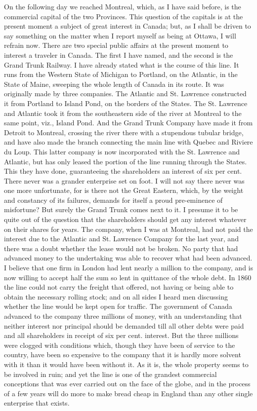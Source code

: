 On the following day we reached Montreal, which, as I have said
before, is the commercial capital of the two Provinces.  This
question of the capitals is at the present moment a subject of
great interest in Canada; but, as I shall be driven to say
something on the matter when I report myself as being at Ottawa, I
will refrain now.  There are two special public affairs at the
present moment to interest a traveler in Canada.  The first I have
named, and the second is the Grand Trunk Railway.  I have already
stated what is the course of this line.  It runs from the Western
State of Michigan to Portland, on the Atlantic, in the State of
Maine, sweeping the whole length of Canada in its route.  It was
originally made by three companies.  The Atlantic and St. Lawrence
constructed it from Portland to Island Pond, on the borders of the
States.  The St. Lawrence and Atlantic took it from the
southeastern side of the river at Montreal to the same point, viz.,
Island Pond.  And the Grand Trunk Company have made it from Detroit
to Montreal, crossing the river there with a stupendous tubular
bridge, and have also made the branch connecting the main line with
Quebec and Riviere du Loup.  This latter company is now
incorporated with the St. Lawrence and Atlantic, but has only
leased the portion of the line running through the States.  This
they have done, guaranteeing the shareholders an interest of six
per cent.  There never was a grander enterprise set on foot.  I
will not say there never was one more unfortunate, for is there not
the Great Eastern, which, by the weight and constancy of its
failures, demands for itself a proud pre-eminence of misfortune?
But surely the Grand Trunk comes next to it.  I presume it to be
quite out of the question that the shareholders should get any
interest whatever on their shares for years.  The company, when I
was at Montreal, had not paid the interest due to the Atlantic and
St. Lawrence Company for the last year, and there was a doubt
whether the lease would not be broken.  No party that had advanced
money to the undertaking was able to recover what had been
advanced.  I believe that one firm in London had lent nearly a
million to the company, and is now willing to accept half the sum
so lent in quittance of the whole debt.  In 1860 the line could not
carry the freight that offered, not having or being able to obtain
the necessary rolling stock; and on all sides I heard men
discussing whether the line would be kept open for traffic.  The
government of Canada advanced to the company three millions of
money, with an understanding that neither interest nor principal
should be demanded till all other debts were paid and all
shareholders in receipt of six per cent.  interest.  But the three
millions were clogged with conditions which, though they have been
of service to the country, have been so expensive to the company
that it is hardly more solvent with it than it would have been
without it.  As it is, the whole property seems to be involved in
ruin; and yet the line is one of the grandest commercial
conceptions that was ever carried out on the face of the globe, and
in the process of a few years will do more to make bread cheap in
England than any other single enterprise that exists.

